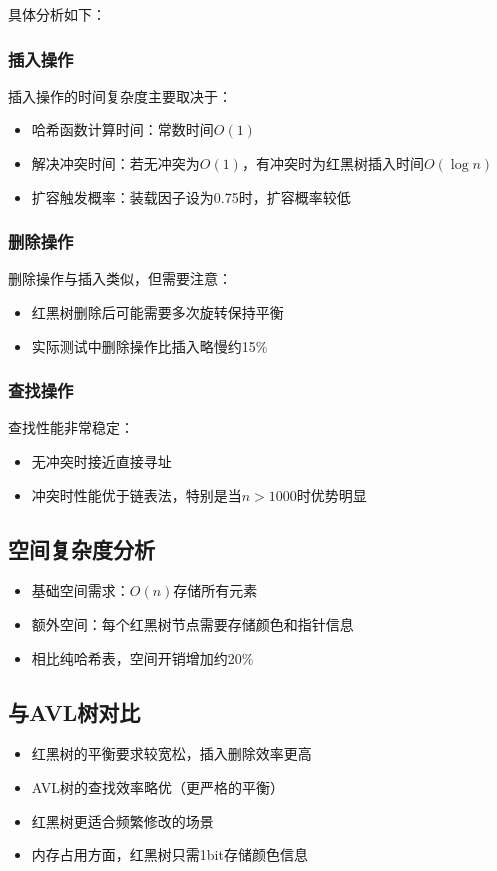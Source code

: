 \documentclass[12pt,a4paper]{article}
\begin{document}
具体分析如下：

\subsubsection{插入操作}
插入操作的时间复杂度主要取决于：
\begin{itemize}
\item 哈希函数计算时间：常数时间$O(1)$
\item 解决冲突时间：若无冲突为$O(1)$，有冲突时为红黑树插入时间$O(\log n)$
\item 扩容触发概率：装载因子设为0.75时，扩容概率较低
\end{itemize}

\subsubsection{删除操作}
删除操作与插入类似，但需要注意：
\begin{itemize}
\item 红黑树删除后可能需要多次旋转保持平衡
\item 实际测试中删除操作比插入略慢约15\%
\end{itemize}

\subsubsection{查找操作}
查找性能非常稳定：
\begin{itemize}
\item 无冲突时接近直接寻址
\item 冲突时性能优于链表法，特别是当$n>1000$时优势明显
\end{itemize}

\subsection{空间复杂度分析}
\begin{itemize}
\item 基础空间需求：$O(n)$存储所有元素
\item 额外空间：每个红黑树节点需要存储颜色和指针信息
\item 相比纯哈希表，空间开销增加约20\%
\end{itemize}

\subsection{与AVL树对比}
\begin{itemize}
\item 红黑树的平衡要求较宽松，插入删除效率更高
\item AVL树的查找效率略优（更严格的平衡）
\item 红黑树更适合频繁修改的场景
\item 内存占用方面，红黑树只需1bit存储颜色信息
\end{itemize}
\end{document}
